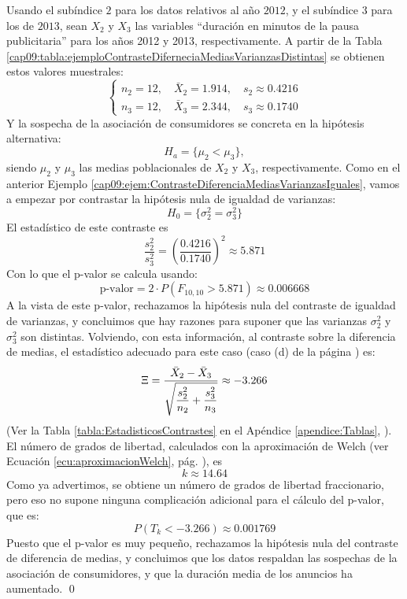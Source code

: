 \begin{ejemplo}
Usando el subíndice $2$ para los datos relativos al año $2012$, y el subíndice $3$ para los de $2013$, sean $X_2$ y $X_3$ las variables {``duración en minutos de la pausa publicitaria''} para los años 2012 y 2013, respectivamente. A partir de la Tabla \ref{cap09:tabla:ejemploContrasteDiferneciaMediasVarianzasDistintas} se obtienen estos valores muestrales:
\[
\begin{cases}
n_2=12,\quad \bar X_2=1.914,\quad s_2\approx 0.4216\\[3mm]
n_3=12,\quad \bar X_3=2.344,\quad s_3\approx 0.1740
\end{cases}
\]
Y la sospecha de la asociación de consumidores se concreta en la hipótesis alternativa:
\[H_a=\{\mu_2<\mu_3\},\]
siendo $\mu_2$ y $\mu_3$ las medias poblacionales de $X_2$ y $X_3$, respectivamente. Como en el anterior Ejemplo \ref{cap09:ejem:ContrasteDiferenciaMediasVarianzasIguales}, vamos a empezar por contrastar la hipótesis nula de igualdad de varianzas:
\[H_0=\{\sigma^2_2=\sigma^2_3\}\]
El estadístico de este contraste es
\[\dfrac{s_2^2}{s_3^2}=\left(\dfrac{0.4216}{0.1740}\right)^2\approx 5.871\]
Con lo que el p-valor se calcula usando:
\[\mbox{p-valor}=2\cdot P\left(F_{10,10}>5.871\right)\approx 0.006668\]
A la vista de este p-valor, rechazamos la hipótesis nula del contraste de igualdad de varianzas, y concluimos que hay razones para suponer que las varianzas $\sigma_2^2$ y $\sigma_3^2$ son distintas. Volviendo, con esta información, al contraste sobre la diferencia de medias, el estadístico adecuado para este caso (caso (d) de la página \pageref{cap09:lugar:ContrasteDiferenciaMediasVarianzasIguales}) es:
\[\Xi=\dfrac{\bar X_2-\bar X_3}{\scriptsize{\sqrt{\dfrac{s_2^2}{n_2}+\dfrac{s_3^2}{n_3}}}}
\approx -3.266\]
(Ver la Tabla \ref{tabla:EstadisticosContrastes} en el Apéndice \ref{apendice:Tablas}, \pageref{tabla:EstadisticosContrastes}). El número de grados de libertad, calculados con la aproximación de Welch (ver Ecuación \ref{ecu:aproximacionWelch}, pág. \pageref{ecu:aproximacionWelch}), es
\[k\approx 14.64\]
Como ya advertimos, se obtiene un número de grados de libertad fraccionario, pero eso no supone ninguna complicación adicional para el cálculo del p-valor, que es:
\[P(T_{k} < -3.266)\approx 0.001769\]
Puesto que el p-valor es muy pequeño, rechazamos la hipótesis nula del contraste de diferencia de medias, y concluimos que los datos respaldan las sospechas de la asociación de consumidores, y que la duración media de los anuncios ha aumentado.
\qed
\end{ejemplo}


